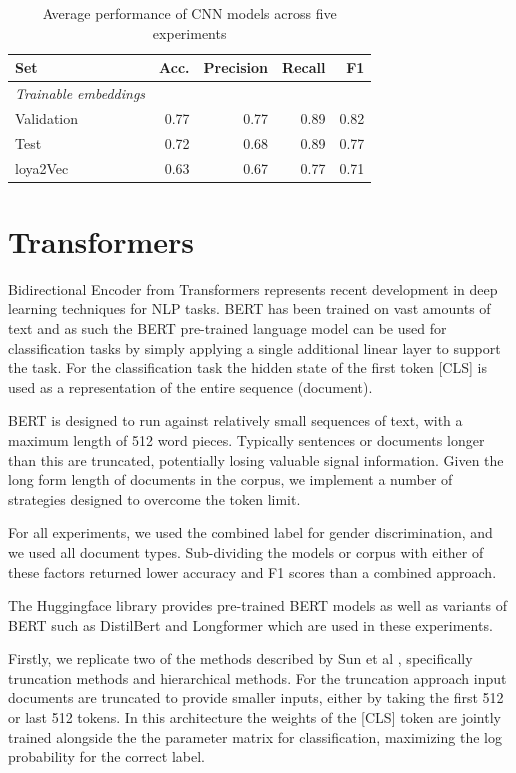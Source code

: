 \documentclass[twocolumn,10pt]{wmrDoc}
\begin{document}
\begin{table}
 \caption{Average performance of CNN models across five experiments}
  \centering
  \begin{tabular}{lrrrr}
    \toprule
    Set & Acc. & Precision & Recall & F1\\
    \midrule
    \em Trainable embeddings \\
    Validation & 0.77 & 0.77 & 0.89 & 0.82 \\
    Test       & 0.72 & 0.68 & 0.89 & 0.77 \\
    \midrule
    loya2Vec       & 0.63 & 0.67 & 0.77 & 0.71 \\
    \bottomrule
  \end{tabular}
  \label{tab:cnn}
\end{table}

\section{Transformers}
Bidirectional Encoder from Transformers \cite{devlin} represents recent development in deep learning techniques for NLP tasks. BERT has been trained on vast amounts of text and as such the BERT pre-trained language model can be used for classification tasks by simply applying a single additional linear layer to support the task. For the classification task the hidden state of the first token [CLS] is used as a representation of the entire sequence (document). 

BERT is designed to run against relatively small sequences of text, with a maximum length of 512 word pieces. Typically sentences or documents longer than this are truncated, potentially losing valuable signal information. Given the long form length of documents in the corpus, we implement a number of strategies designed to overcome the token limit.

For all experiments, we used the combined label for gender discrimination, and we used all document types. Sub-dividing the models or corpus with either of these factors returned lower accuracy and F1 scores than a combined approach.

The Huggingface library provides pre-trained BERT models as well as  variants of BERT such as DistilBert and Longformer which are used in these experiments. 

Firstly, we replicate two of the methods described by Sun et al \cite{sun}, specifically truncation methods and hierarchical methods. For the truncation approach input documents are truncated to provide smaller inputs, either by taking the first 512 or last 512 tokens. In this architecture the weights of the [CLS] token are jointly trained alongside the the parameter matrix for classification, maximizing the log probability for the correct label.
\end{document}
